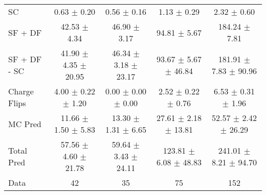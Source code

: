 \begin{tabular}{l|cccc}
                                 SC &  0.63 $\pm$  0.20 &  0.56 $\pm$  0.16 &  1.13 $\pm$  0.29 &  2.32 $\pm$  0.60 \\
                            SF + DF & 42.53 $\pm$  4.34 & 46.90 $\pm$  3.17 & 94.81 $\pm$  5.67 & 184.24 $\pm$  7.81 \\
\hline
                       SF + DF - SC & 41.90 $\pm$  4.35 $\pm$ 20.95 & 46.34 $\pm$  3.18 $\pm$ 23.17 & 93.67 $\pm$  5.67 $\pm$ 46.84 & 181.91 $\pm$  7.83 $\pm$ 90.96 \\
\hline\hline
                       Charge Flips &  4.00 $\pm$  0.22 $\pm$  1.20 &  0.00 $\pm$  0.00 $\pm$  0.00 &  2.52 $\pm$  0.22 $\pm$  0.76 &  6.53 $\pm$  0.31 $\pm$  1.96 \\
\hline
                            MC Pred & 11.66 $\pm$  1.50 $\pm$  5.83 & 13.30 $\pm$  1.31 $\pm$  6.65 & 27.61 $\pm$  2.18 $\pm$ 13.81 & 52.57 $\pm$  2.42 $\pm$ 26.29 \\
\hline
                         Total Pred & 57.56 $\pm$  4.60 $\pm$ 21.78 & 59.64 $\pm$  3.43 $\pm$ 24.11 & 123.81 $\pm$  6.08 $\pm$ 48.83 & 241.01 $\pm$  8.21 $\pm$ 94.70 \\
\hline\hline
                               Data &    42 &    35 &    75 &   152 \\
\hline\hline
\end{tabular}

